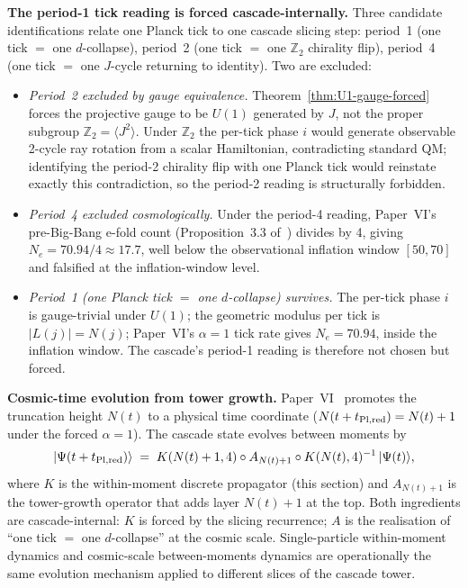 \documentclass[12pt,a4paper]{article}
\begin{document}
\medskip\noindent\textbf{The period-1 tick reading is forced
cascade-internally.} Three candidate identifications relate one
Planck tick to one cascade slicing step: period~1 (one tick $=$ one
$d$-collapse), period~2 (one tick $=$ one $\mathbb{Z}_2$ chirality
flip), period~4 (one tick $=$ one $J$-cycle returning to identity).
Two are excluded:
\begin{itemize}[nosep]
\item \emph{Period~2 excluded by gauge equivalence.}
Theorem~\ref{thm:U1-gauge-forced} forces the projective gauge to be
$U(1)$ generated by $J$, not the proper subgroup
$\mathbb{Z}_2 = \langle J^2\rangle$. Under $\mathbb{Z}_2$ the per-tick
phase $i$ would generate observable 2-cycle ray rotation from a
scalar Hamiltonian, contradicting standard QM; identifying the
period-2 chirality flip with one Planck tick would reinstate exactly
this contradiction, so the period-2 reading is structurally
forbidden.
\item \emph{Period~4 excluded cosmologically.} Under the period-4
reading, Paper~VI's pre-Big-Bang e-fold count
(Proposition~3.3 of~\cite{part6}) divides by 4, giving
$N_e = 70.94/4 \approx 17.7$, well below the observational inflation
window $[50, 70]$ and falsified at the inflation-window level.
\item \emph{Period~1 (one Planck tick $=$ one $d$-collapse) survives.}
The per-tick phase $i$ is gauge-trivial under $U(1)$; the geometric
modulus per tick is $|L(j)| = N(j)$; Paper~VI's $\alpha = 1$ tick
rate gives $N_e = 70.94$, inside the inflation window. The cascade's
period-1 reading is therefore not chosen but forced.
\end{itemize}

\medskip\noindent\textbf{Cosmic-time evolution from tower growth.}
Paper~VI~\cite{part6} promotes the truncation height $N(t)$ to a
physical time coordinate ($N(t + t_{\rm Pl,red}) = N(t) + 1$ under the
forced $\alpha = 1$). The cascade state evolves between moments by
\[
|\Psi(t + t_{\rm Pl,red})\rangle
\;=\; K(N(t)+1, 4) \circ A_{N(t)+1} \circ K(N(t), 4)^{-1}\,
|\Psi(t)\rangle,
\]
where $K$ is the within-moment discrete propagator (this section) and
$A_{N(t)+1}$ is the tower-growth operator that adds layer $N(t)+1$ at
the top. Both ingredients are cascade-internal: $K$ is forced by the
slicing recurrence; $A$ is the realisation of ``one tick $=$ one
$d$-collapse'' at the cosmic scale. Single-particle within-moment
dynamics and cosmic-scale between-moments dynamics are operationally
the same evolution mechanism applied to different slices of the
cascade tower.
\end{document}
